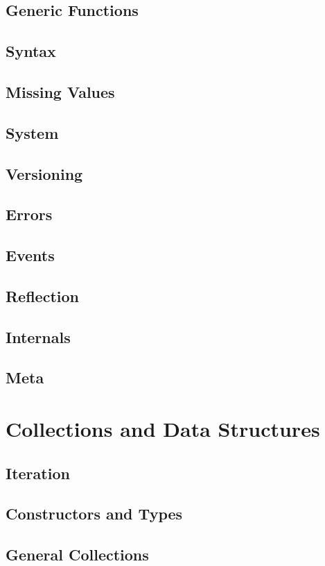     \section{Generic Functions}
    \section{Syntax}
    \section{Missing Values}
    \section{System}
    \section{Versioning}
    \section{Errors}
    \section{Events}
    \section{Reflection}
    \section{Internals}
    \section{Meta}
  \chapter{Collections and Data Structures}
    \section{Iteration}
    \section{Constructors and Types}
    \section{General Collections}
